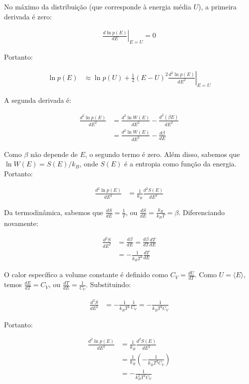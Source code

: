 \documentclass[fleqn,a4paper]{article}
\begin{document}
No máximo da distribuição (que corresponde à energia média $U$), a primeira derivada é zero:

\begin{align}
\left.\frac{d\ln p(E)}{dE}\right|_{E=U} = 0
\end{align}

Portanto:

\begin{align}
\ln p(E) &\approx \ln p(U) + \frac{1}{2}(E-U)^2\left.\frac{d^2\ln p(E)}{dE^2}\right|_{E=U}
\end{align}

A segunda derivada é:

\begin{align}
\frac{d^2\ln p(E)}{dE^2} &= \frac{d^2\ln W(E)}{dE^2} - \frac{d^2(\beta E)}{dE^2} \\
&= \frac{d^2\ln W(E)}{dE^2} - \frac{d\beta}{dE}
\end{align}

Como $\beta$ não depende de $E$, o segundo termo é zero. Além disso, sabemos que $\ln W(E) = S(E)/k_B$, onde $S(E)$ é a entropia como função da energia. Portanto:

\begin{align}
\frac{d^2\ln p(E)}{dE^2} &= \frac{1}{k_B}\frac{d^2 S(E)}{dE^2}
\end{align}

Da termodinâmica, sabemos que $\frac{dS}{dE} = \frac{1}{T}$, ou $\frac{dS}{dE} = \frac{k_B}{k_B T} = \beta$. Diferenciando novamente:

\begin{align}
\frac{d^2 S}{dE^2} &= \frac{d\beta}{dE} = \frac{d\beta}{dT}\frac{dT}{dE} \\
&= -\frac{1}{k_B T^2}\frac{dT}{dE}
\end{align}

O calor específico a volume constante é definido como $C_V = \frac{dU}{dT}$. Como $U = \langle E \rangle$, temos $\frac{dE}{dT} = C_V$, ou $\frac{dT}{dE} = \frac{1}{C_V}$. Substituindo:

\begin{align}
\frac{d^2 S}{dE^2} &= -\frac{1}{k_B T^2}\frac{1}{C_V} = -\frac{1}{k_B T^2 C_V}
\end{align}

Portanto:

\begin{align}
\frac{d^2\ln p(E)}{dE^2} &= \frac{1}{k_B}\frac{d^2 S(E)}{dE^2} \\
&= \frac{1}{k_B} \left(-\frac{1}{k_B T^2 C_V}\right) \\
&= -\frac{1}{k_B^2 T^2 C_V}
\end{align}
\end{document}
